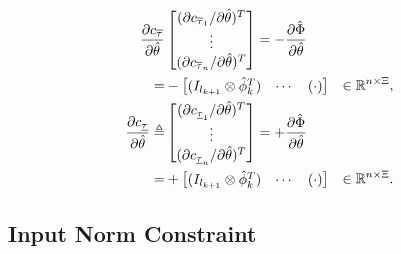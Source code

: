 \documentclass[lettersize,journal]{IEEEtran}
\begin{document}
\begin{equation}
    \begin{aligned}
        {\partial \mathbf \mathbf c_{\overline \tau} \over \partial \hat\theta}
        & 
        \begin{bmatrix}
            (\partial c_{\overline \tau_1}/\partial \hat\theta)^T \\
            \vdots \\
            (\partial c_{\overline \tau_n}/\partial \hat\theta)^T
        \end{bmatrix}
         = -{\partial \hat\Phi\over\partial\hat\theta}
         \\
        =&
        -\begin{bmatrix}
            (I_{l_{k+1}}\otimes \hat\phi_{k}^T)&
            \cdots &
            (
            \cdot
            )
        \end{bmatrix} 
        &
        \in
        \mathbb R^{n\times \Xi}
        , 
        \\
        {\partial \mathbf \mathbf c_{\underline\tau} \over \partial \hat\theta}         
        \triangleq
        & 
        \begin{bmatrix}
            (\partial c_{\underline\tau_1}/\partial \hat\theta)^T \\
            \vdots \\
            (\partial c_{\underline\tau_n}/\partial \hat\theta)^T
        \end{bmatrix}
        = +{\partial \hat\Phi\over\partial\hat\theta}
        \\
        =&
        +\begin{bmatrix}
            (I_{l_{k+1}}\otimes \hat\phi_{k}^T)&
            \cdots &
            (
            \cdot
            )
        \end{bmatrix} 
        &
        \in
        \mathbb R^{n\times \Xi}
        .
    \end{aligned}
    \label{eq. nabla input sat}
\end{equation}

\subsection{Input Norm Constraint}\label{sec:input_norm_cnst}
\end{document}

